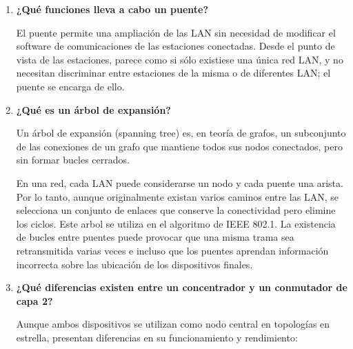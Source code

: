 \documentclass[11pt,a4paper]{article}
\begin{document}
\begin{enumerate}[label=15.\arabic*), itemsep=0.3cm]
\begin{enumerate}
        \item \textbf{Direccionamiento físico:}
        Utiliza las direcciones físicas (direcciones MAC) de origen y destino para asegurarse de que cada paquete llegue exactamente a la tarjeta de red que corresponde.

        \item \textbf{Detección de errores:}
        Calcula un código de verificación (CRC o FCS) antes de transmitir la trama. El receptor vuelve a calcularlo al recibirla para comprobar si algún bit se corrompió en el camino y, de ser así, descartarla.

        \item \textbf{Delimitación de tramas:}
        Añade marcas especiales (como un preámbulo) al inicio y al final de cada envío para que la placa receptora sepa exactamente dónde empieza y termina cada paquete de datos.
    \end{enumerate}
  \item
  \textbf{¿Qué funciones lleva a cabo un puente?}

  El puente permite una ampliación de las LAN sin necesidad de modificar el software de comunicaciones de las estaciones conectadas. Desde el punto de vista de las estaciones, parece como si sólo existiese una única red LAN, y no necesitan discriminar entre estaciones de la misma o de diferentes LAN; el puente se encarga de ello.

  \item 
  \textbf{¿Qué es un árbol de expansión?}

  Un árbol de expansión (spanning tree) es, en teoría de grafos, un subconjunto de las conexiones de un grafo que mantiene todos sus nodos conectados, pero sin formar bucles cerrados. 
  
  En una red, cada LAN puede considerarse un nodo y cada puente una arista. Por lo tanto, aunque originalmente existan varios caminos entre las LAN, se selecciona un conjunto de enlaces que conserve la conectividad pero elimine los ciclos. Este arbol se utiliza en el algoritmo de IEEE 802.1. La existencia de bucles entre puentes puede provocar que una misma trama sea retransmitida varias veces e incluso que los puentes aprendan información incorrecta sobre las ubicación de los dispositivos finales.

  \item 
  \textbf{¿Qué diferencias existen entre un concentrador y un conmutador de capa 2?}

        Aunque ambos dispositivos se utilizan como nodo central en topologías en estrella, presentan diferencias en su funcionamiento y rendimiento:


\end{enumerate}
\end{document}
